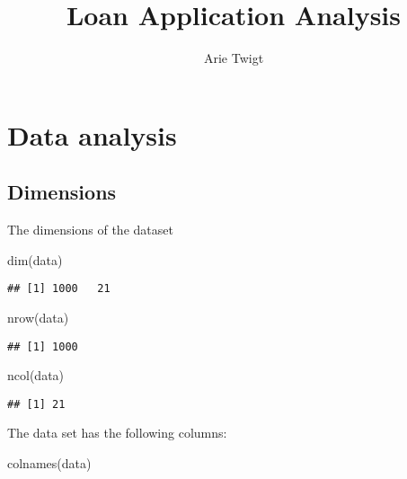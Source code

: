 \documentclass[
]{article}
\title{Loan Application Analysis}
\author{Arie Twigt}
\date{}
\newenvironment{Shaded}{\begin{snugshade}}{\end{snugshade}}
\newcommand{\FunctionTok}[1]{\textcolor[rgb]{0.00,0.00,0.00}{#1}}
\newcommand{\NormalTok}[1]{#1}
\begin{document}
\maketitle

{
\setcounter{tocdepth}{3}
\tableofcontents
}
\hypertarget{data-analysis}{%
\section{Data analysis}\label{data-analysis}}

\hypertarget{dimensions}{%
\subsection{Dimensions}\label{dimensions}}

The dimensions of the dataset

\begin{Shaded}
\begin{Highlighting}[]
\FunctionTok{dim}\NormalTok{(data)}
\end{Highlighting}
\end{Shaded}

\begin{verbatim}
## [1] 1000   21
\end{verbatim}

\begin{Shaded}
\begin{Highlighting}[]
\FunctionTok{nrow}\NormalTok{(data)}
\end{Highlighting}
\end{Shaded}

\begin{verbatim}
## [1] 1000
\end{verbatim}

\begin{Shaded}
\begin{Highlighting}[]
\FunctionTok{ncol}\NormalTok{(data)}
\end{Highlighting}
\end{Shaded}

\begin{verbatim}
## [1] 21
\end{verbatim}

The data set has the following columns:

\begin{Shaded}
\begin{Highlighting}[]
\FunctionTok{colnames}\NormalTok{(data)}
\end{Highlighting}
\end{Shaded}
\end{document}
